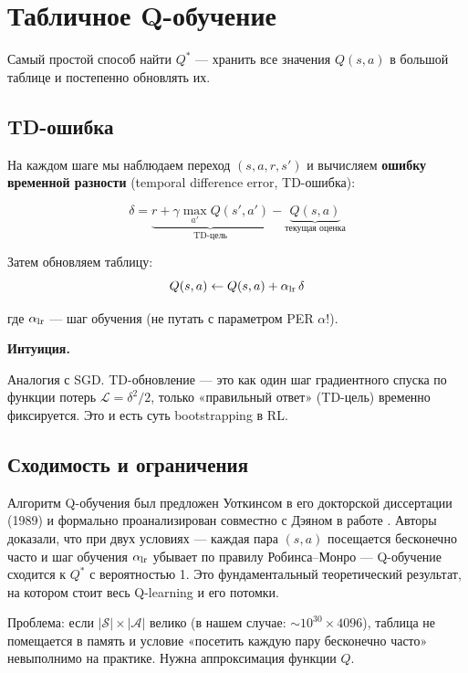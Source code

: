 \documentclass[a4paper, 11pt]{article}
\newenvironment{notebox}{%
  \begin{mdframed}[style=notestyle]
  {\bfseries\color{noteborder}Интуиция.}\quad\ignorespaces
}{%
  \end{mdframed}
}
\begin{document}
\section{Табличное Q-обучение}

Самый простой способ найти $Q^*$ — хранить все значения $Q(s, a)$ в
большой таблице и постепенно обновлять их.

\subsection{TD-ошибка}

На каждом шаге мы наблюдаем переход $(s, a, r, s')$ и вычисляем
\textbf{ошибку временной разности} (temporal difference error, TD-ошибка):

\begin{equation}
  \delta = \underbrace{r + \gamma \max_{a'} Q(s', a')}_{\text{TD-цель}}
           - \underbrace{Q(s, a)}_{\text{текущая оценка}}
  \label{eq:td_error}
\end{equation}

Затем обновляем таблицу:
\[
  Q(s, a) \leftarrow Q(s, a) + \alpha_{\rm lr}\, \delta
\]

где $\alpha_{\rm lr}$ — шаг обучения (не путать с параметром PER $\alpha$!).

\begin{notebox}
Аналогия с SGD. TD-обновление — это как один шаг градиентного спуска по
функции потерь $\mathcal{L} = \delta^2 / 2$, только «правильный ответ»
(TD-цель) временно фиксируется. Это и есть суть bootstrapping в RL.
\end{notebox}

\subsection{Сходимость и ограничения}

Алгоритм Q-обучения был предложен Уоткинсом в его докторской диссертации
(1989) и формально проанализирован совместно с Дэяном в работе
\cite{Watkins92}. Авторы доказали, что при двух условиях — каждая пара
$(s, a)$ посещается бесконечно часто и шаг обучения $\alpha_{\rm lr}$
убывает по правилу Робинса--Монро — Q-обучение сходится к $Q^*$ с
вероятностью 1. Это фундаментальный теоретический результат, на котором
стоит весь Q-learning и его потомки.

Проблема: если $|\mathcal{S}| \times |\mathcal{A}|$ велико
(в нашем случае: $\sim 10^{30} \times 4096$), таблица не помещается
в память и условие «посетить каждую пару бесконечно часто» невыполнимо
на практике. Нужна аппроксимация функции $Q$.
\end{document}
